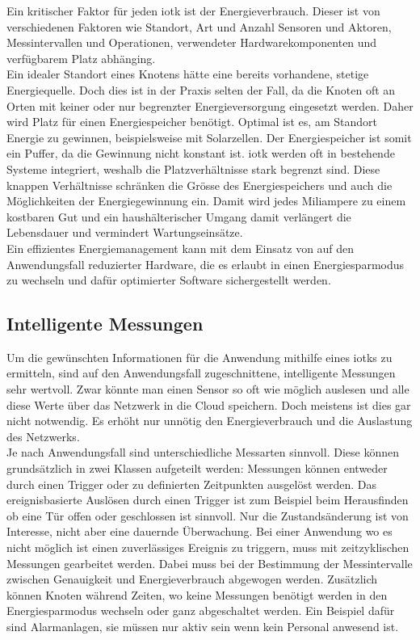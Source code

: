 Ein kritischer Faktor für jeden \gls{iotk} ist der Energieverbrauch. Dieser ist von verschiedenen Faktoren wie Standort, Art und Anzahl Sensoren und Aktoren, Messintervallen und Operationen, verwendeter Hardwarekomponenten und verfügbarem Platz abhänging.\\
Ein idealer Standort eines Knotens hätte eine bereits vorhandene, stetige Energiequelle. Doch dies ist in der Praxis selten der Fall, da die Knoten oft an Orten mit keiner oder nur begrenzter Energieversorgung eingesetzt werden. Daher wird Platz für einen Energiespeicher benötigt. Optimal ist es, am Standort Energie zu gewinnen, beispielsweise mit Solarzellen. Der Energiespeicher ist somit ein Puffer, da die Gewinnung nicht konstant ist. \gls{iotk} werden oft in bestehende Systeme integriert, weshalb die Platzverhältnisse stark begrenzt sind. Diese knappen Verhältnisse schränken die Grösse des Energiespeichers und auch die Möglichkeiten der Energiegewinnung ein. Damit wird jedes Miliampere zu einem kostbaren Gut und ein haushälterischer Umgang damit verlängert die Lebensdauer und vermindert Wartungseinsätze.\\
Ein effizientes Energiemanagement kann mit dem Einsatz von auf den Anwendungsfall reduzierter Hardware, die es erlaubt in einen Energiesparmodus zu wechseln und dafür optimierter Software sichergestellt werden.

\subsection*{Intelligente Messungen}

Um die gewünschten Informationen für die Anwendung mithilfe eines \glspl{iotk} zu ermitteln, sind auf den Anwendungsfall zugeschnittene, intelligente Messungen sehr wertvoll. Zwar könnte man einen Sensor so oft wie möglich auslesen und alle diese Werte über das Netzwerk in die Cloud speichern. Doch meistens ist dies gar nicht notwendig. Es erhöht nur unnötig den Energieverbrauch und die Auslastung des Netzwerks.\\
Je nach Anwendungsfall sind unterschiedliche Messarten sinnvoll. Diese können grundsätzlich in zwei Klassen aufgeteilt werden: Messungen können entweder durch einen Trigger oder zu definierten Zeitpunkten ausgelöst werden. Das ereignisbasierte Auslösen durch einen Trigger ist zum Beispiel beim Herausfinden ob eine Tür offen oder geschlossen ist sinnvoll. Nur die Zustandsänderung ist von Interesse, nicht aber eine dauernde Überwachung. Bei einer Anwendung wo es nicht möglich ist einen zuverlässiges Ereignis zu triggern, muss mit zeitzyklischen Messungen gearbeitet werden. Dabei muss bei der Bestimmung der Messintervalle zwischen Genauigkeit und Energieverbrauch abgewogen werden. Zusätzlich können Knoten während Zeiten, wo keine Messungen benötigt werden in den Energiesparmodus wechseln oder ganz abgeschaltet werden. Ein Beispiel dafür sind Alarmanlagen, sie müssen nur aktiv sein wenn kein Personal anwesend ist.

